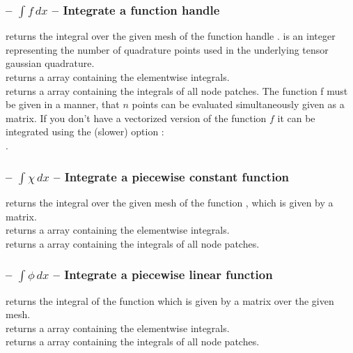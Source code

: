 \documentclass[twoside,11pt,a4paper]{article} %
\begin{document}
\subsubsection*{\texorpdfstring{ -- $\int f \,dx $ --}{} Integrate a function handle}
 returns the integral over the given mesh of the function handle .  is an integer representing the number of quadrature points used
in the underlying tensor gaussian quadrature. \\
 returns a
 array containing the elementwise integrals. \\
 returns a
 array containing the integrals of all node patches.
The function f must be given in a manner, that $n$ points can
be evaluated simultaneously given as a  matrix.
If you don't have a vectorized version of the function $f$ it can be
integrated using the (slower) option : \\
.
\subsubsection*{\texorpdfstring{ -- $\int \chi \,dx $ --}{} Integrate a piecewise constant function}
 returns the integral over the given mesh of the function , which is given by a  matrix. \\
 returns a 
array containing the elementwise integrals. \\
 returns a 
array containing the integrals of all node patches.

\subsubsection*{\texorpdfstring{ -- $\int \phi \,dx $ --}{} Integrate a piecewise linear function}
 returns the integral of the function  which is given by a  matrix over the given mesh. \\
 returns a  array containing the elementwise integrals. \\
 returns a 
array containing the integrals of all node patches.
\end{document}
